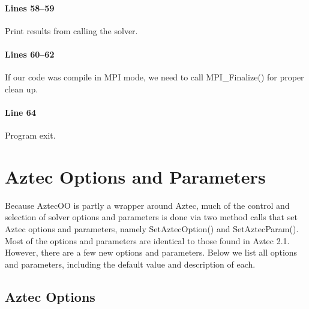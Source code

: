 \documentclass[12pt,relax]{AztecOOUserGuide}
\begin{document}
\paragraph{Lines 58--59}
Print results from calling the solver.
\paragraph{Lines 60--62}
If our code was compile in MPI mode, we need to call MPI\_Finalize()
for proper clean up.
\paragraph{Line 64} Program exit.

\section{Aztec Options and Parameters\label{Section:OptionsAndParams}}

Because AztecOO is partly a wrapper around Aztec, much of the
control and selection of solver options and parameters is done via two
method calls that set Aztec options and parameters, namely
SetAztecOption() and SetAztecParam().  Most of the
options and parameters are identical to those found in Aztec 2.1.
However, there are a few new options and parameters.  Below we
list all options and parameters, including the default value and
description of each.

\subsection{Aztec Options\label{optionI}}
\end{document}
